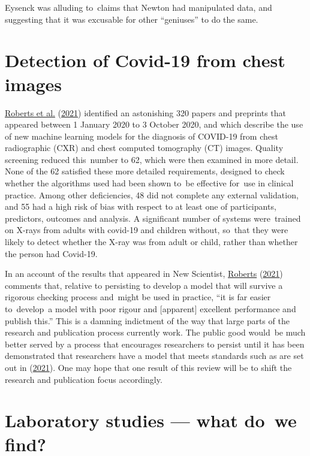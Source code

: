 \documentclass[
  10pt,
  b5paper]{book}
\begin{document}
Eysenck was alluding to~claims that Newton had manipulated data, and
suggesting that it was excusable for other ``geniuses'' to do the same.

\hypertarget{detection-of-covid-19-from-chest-images}{%
\section{Detection of Covid-19 from chest images}\label{detection-of-covid-19-from-chest-images}}

\protect\hyperlink{ref-roberts2021common}{Roberts et al.} (\protect\hyperlink{ref-roberts2021common}{2021}) identified an astonishing 320 papers and preprints
that appeared between 1 January 2020 to 3 October 2020, and which
describe the use of new machine learning models for the diagnosis of
COVID-19 from chest radiographic (CXR) and chest computed tomography
(CT) images. Quality screening reduced this~number to 62, which were
then examined in more detail. None of the 62 satisfied these more
detailed requirements, designed to check whether the algorithms used
had been shown to~be effective for~use in clinical practice. Among
other deficiencies, 48 did not complete any external validation, and
55 had a high risk of bias with respect to at least one of
participants, predictors, outcomes and analysis. A significant number
of systems were~trained on X-rays from adults with covid-19 and
children without, so~that they were likely to detect whether the
X-ray was from adult or child, rather than whether the person had
Covid-19.

In an account of the results that appeared in New Scientist,
\protect\hyperlink{ref-roberts2021AIcovid19}{Roberts} (\protect\hyperlink{ref-roberts2021AIcovid19}{2021}) comments that, relative to persisting to
develop a model that will survive a rigorous
checking process and~might be used in practice, ``it is far easier
to~develop~a model with poor rigour and {[}apparent{]} excellent
performance and publish this.'' This is a damning indictment of
the way that large parts of the research and publication process
currently work. The public good would~be much better served
by a process that encourages researchers to persist until it
has been demonstrated that researchers have a model that meets
standards such as are set out in (\protect\hyperlink{ref-roberts2021common}{2021}). One may
hope that one result of this review will be to shift the research
and publication focus accordingly.

\hypertarget{sec:lab}{%
\section{Laboratory studies --- what do~we find?}\label{sec:lab}}
\end{document}
